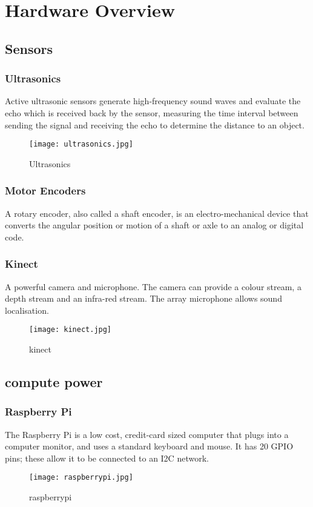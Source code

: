 \section{Hardware Overview}

\subsection{Sensors}
\subsubsection{Ultrasonics}
Active ultrasonic sensors generate high-frequency sound waves and evaluate the echo which is received back by the sensor, measuring the time interval between sending the signal and receiving the echo to determine the distance to an object.
\begin{figure}[!htb]
\begin{center}
\texttt{[image: ultrasonics.jpg]}
\end{center}
\caption{Ultrasonics}
\label{fig:Ultrasonics}
\end{figure}

\subsubsection{Motor Encoders}
A rotary encoder, also called a shaft encoder, is an electro-mechanical device that converts the angular position or motion of a shaft or axle to an analog or digital code. 

\subsubsection{Kinect}
A powerful camera and microphone. The camera can provide a colour stream, a depth stream and an infra-red stream. The array microphone allows sound localisation. 
\begin{figure}[!htb]
\begin{center}
\texttt{[image: kinect.jpg]}
\end{center}
\caption{kinect}
\label{fig:kinect}
\end{figure}

\subsection{compute power}
\subsubsection{Raspberry Pi}
The Raspberry Pi is a low cost, credit-card sized computer that plugs into a computer monitor, and uses a standard keyboard and mouse. It has 20 GPIO pins; these allow it to be connected to an I2C network. 
\begin{figure}[!htb]
\begin{center}
\texttt{[image: raspberrypi.jpg]}
\end{center}
\caption{raspberrypi}
\label{fig:raspberrypi}
\end{figure}

